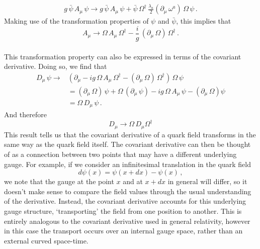 %
\begin{align}
g\,\bar{\psi}\,A_\mu\,\psi \rightarrow g\,\bar{\psi}\,A_\mu\,\psi + \bar{\psi}\,\Omega^\dag\,\frac{\lambda_a}{2}(\partial_\mu\,\omega^a)\,\Omega\,\psi\, .
\end{align}
%
Making use of the transformation properties of $\psi$ and $\bar{\psi}$, this implies that
%
\begin{equation}
A_\mu\rightarrow \Omega\,A_\mu\,\Omega^\dag - \frac{i}{g}\,(\partial_\mu\,\Omega)\,\Omega^\dag\, . 
\label{eq:GaugePotentialTrans}
\end{equation}\\
%

This transformation property can also be expressed in terms of the covariant derivative. Doing so, we find that
%
\begin{align*}
D_\mu\,\psi \rightarrow &\left(\partial_\mu -ig\,\Omega\,A_\mu\,\Omega^\dag - (\partial_\mu\,\Omega)\,\Omega^\dag\right)\,\Omega\,\psi\\
&= (\partial_\mu\,\Omega)\,\psi + \Omega\,(\partial_\mu\,\psi) - ig\,\Omega\,A_\mu\,\psi - (\partial_\mu\,\Omega)\psi\\
&=\Omega\,D_\mu\,\psi\, .
\end{align*}
%
And therefore
%
\begin{equation}
D_{\mu}\rightarrow\Omega\,D_\mu \Omega^\dag
\end{equation}
%
This result tells us that the covariant derivative of a quark field transforms in the same way as the quark field itself. The covariant derivative can then be thought of as a connection between two points that may have a different underlying gauge. For example, if we consider an infinitesimal translation in the quark field
%
\begin{equation*}
d\psi(x) = \psi(x+dx)-\psi(x)\, ,
\end{equation*} 
%
we note that the gauge at the point $x$ and at $x+dx$ in general will differ, so it doesn't make sense to compare the field values through the usual understanding of the derivative. Instead, the covariant derivative accounts for this underlying gauge structure, `transporting' the field from one position to another. This is entirely analogous to the covariant derivative used in general relativity, however in this case the transport occurs over an internal gauge space, rather than an external curved space-time.\\

